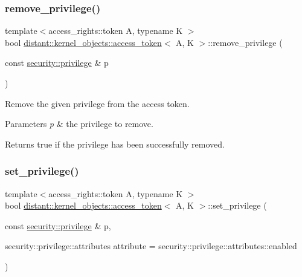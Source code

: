 \subsubsection{\texorpdfstring{remove\+\_\+privilege()}{remove\_privilege()}}
{\footnotesize\ttfamily template$<$access\+\_\+rights\+::token A, typename K $>$ \\
bool \mbox{\hyperlink{classdistant_1_1kernel__objects_1_1access__token}{distant\+::kernel\+\_\+objects\+::access\+\_\+token}}$<$ A, K $>$\+::remove\+\_\+privilege (\begin{DoxyParamCaption}\item[{const \mbox{\hyperlink{classdistant_1_1security_1_1privilege}{security\+::privilege}} \&}]{p }\end{DoxyParamCaption})\hspace{0.3cm}{\ttfamily [noexcept]}}

Remove the given privilege from the access token. 
\begin{DoxyParams}{Parameters}
{\em p} & the privilege to remove. \\
\hline
\end{DoxyParams}
\begin{DoxyReturn}{Returns}
true if the privilege has been successfully removed. 
\end{DoxyReturn}
\mbox{\label{classdistant_1_1kernel__objects_1_1access__token_aa51295b8d8f8602743d5d431806a29c4}} 
\subsubsection{\texorpdfstring{set\+\_\+privilege()}{set\_privilege()}}
{\footnotesize\ttfamily template$<$access\+\_\+rights\+::token A, typename K $>$ \\
bool \mbox{\hyperlink{classdistant_1_1kernel__objects_1_1access__token}{distant\+::kernel\+\_\+objects\+::access\+\_\+token}}$<$ A, K $>$\+::set\+\_\+privilege (\begin{DoxyParamCaption}\item[{const \mbox{\hyperlink{classdistant_1_1security_1_1privilege}{security\+::privilege}} \&}]{p,  }\item[{security\+::privilege\+::attributes}]{attribute = {\ttfamily security\+:\+:privilege\+:\+:attributes\+:\+:enabled} }\end{DoxyParamCaption})\hspace{0.3cm}{\ttfamily [noexcept]}}

